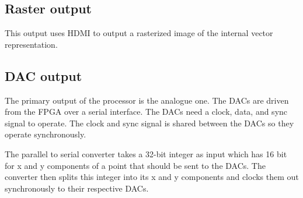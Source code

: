 \subsection{Raster output}

This output uses HDMI to output a rasterized image of the internal vector representation.

\subsection{DAC output}

The primary output of the processor is the analogue one. The DACs are driven from the FPGA over a serial interface. The DACs need a clock, data, and sync signal to operate. The clock and sync signal is shared between the DACs so they operate synchronously. 

The parallel to serial converter takes a 32-bit integer as input which has 16 bit for x and y components of a point that should be sent to the DACs. The converter then splits this integer into its x and y components and clocks them out synchronously to their respective DACs.